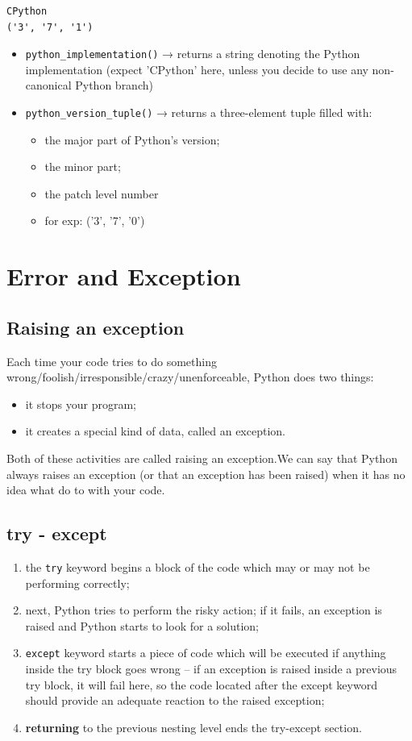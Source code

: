 \documentclass[11pt]{article}
\begin{document}
\begin{verbatim}
CPython
('3', '7', '1')
\end{verbatim}

\begin{itemize}
\item \texttt{python\_implementation()} → returns a string denoting the Python
implementation (expect 'CPython' here, unless you decide to use any
non-canonical Python branch)
\item \texttt{python\_version\_tuple()} → returns a three-element tuple filled with:
\begin{itemize}
\item the major part of Python’s version;
\item the minor part;
\item the patch level number
\item for exp:  ('3', '7', '0')
\end{itemize}
\end{itemize}

\section{Error and Exception}
\label{sec:orgea774fc}
\subsection{Raising an exception}
\label{sec:org74dd9c7}
Each time your code tries to do something
wrong/foolish/irresponsible/crazy/unenforceable, Python does two
things:

\begin{itemize}
\item it stops your program;
\item it creates a special kind of data, called an exception.
\end{itemize}

Both of these activities are called raising an exception.We can say
that Python always raises an exception (or that an exception has been
raised) when it has no idea what do to with your code.

\subsection{try - except}
\label{sec:org30e0bd1}
\begin{enumerate}
\item the \texttt{try} keyword begins a block of the code which may or may not be
performing correctly;
\item next, Python tries to perform the risky action; if it fails, an
exception is raised and Python starts to look for a solution;
\item \texttt{except} keyword starts a piece of code which will be executed if
anything inside the try block goes wrong – if an exception is
raised inside a previous try block, it will fail here, so the code
located after the except keyword should provide an adequate
reaction to the raised exception;
\item \textbf{returning} to the previous nesting level ends the try-except
section.
\end{enumerate}
\end{document}
